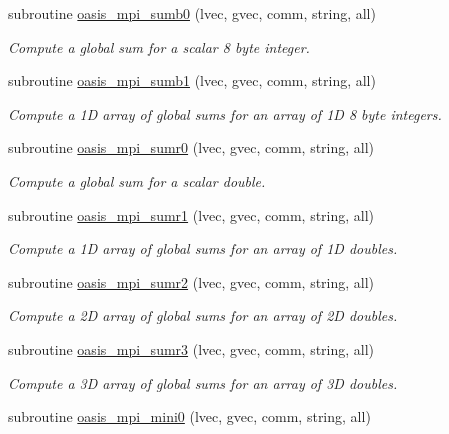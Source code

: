 \begin{DoxyCompactItemize}
subroutine \hyperlink{classmod__oasis__mpi_ae4d2818f21f445e594aad97598f49d8e}{oasis\+\_\+mpi\+\_\+sumb0} (lvec, gvec, comm, string, all)
\begin{DoxyCompactList}\small\item\em Compute a global sum for a scalar 8 byte integer. \end{DoxyCompactList}\item 
subroutine \hyperlink{classmod__oasis__mpi_a3f32594b15b9ae3629969839ab952012}{oasis\+\_\+mpi\+\_\+sumb1} (lvec, gvec, comm, string, all)
\begin{DoxyCompactList}\small\item\em Compute a 1\+D array of global sums for an array of 1\+D 8 byte integers. \end{DoxyCompactList}\item 
subroutine \hyperlink{classmod__oasis__mpi_a02b0555479a3d54e1c3d42219af9b991}{oasis\+\_\+mpi\+\_\+sumr0} (lvec, gvec, comm, string, all)
\begin{DoxyCompactList}\small\item\em Compute a global sum for a scalar double. \end{DoxyCompactList}\item 
subroutine \hyperlink{classmod__oasis__mpi_aac62148bc912b158aff769572f27b8d3}{oasis\+\_\+mpi\+\_\+sumr1} (lvec, gvec, comm, string, all)
\begin{DoxyCompactList}\small\item\em Compute a 1\+D array of global sums for an array of 1\+D doubles. \end{DoxyCompactList}\item 
subroutine \hyperlink{classmod__oasis__mpi_afbc665ae71c97d0b0467323cd86a5973}{oasis\+\_\+mpi\+\_\+sumr2} (lvec, gvec, comm, string, all)
\begin{DoxyCompactList}\small\item\em Compute a 2\+D array of global sums for an array of 2\+D doubles. \end{DoxyCompactList}\item 
subroutine \hyperlink{classmod__oasis__mpi_a41836fe23aeb81e65b4d24f6f0c90953}{oasis\+\_\+mpi\+\_\+sumr3} (lvec, gvec, comm, string, all)
\begin{DoxyCompactList}\small\item\em Compute a 3\+D array of global sums for an array of 3\+D doubles. \end{DoxyCompactList}\item 
subroutine \hyperlink{classmod__oasis__mpi_a2832568cd4d34db40cdcc39ffa876474}{oasis\+\_\+mpi\+\_\+mini0} (lvec, gvec, comm, string, all)

\end{DoxyCompactItemize}

